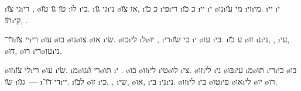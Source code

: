 
\i{גי}  \u{צו}\i{רי}   , \o{לו}: \u{טו} \u{גו}   \u{טו}  \i{בי}. \i{גי} \u{גו}\i{ני} \o{או} \u{צו},  \i{כ} \u{כו}  \i{פּי}\i{רי} \i{כ} \u{כו} \i{יי} \i{י} \o{נו}\i{מי} \u{עו} \i{זי}\i{מי}.  \i{יי} \i{י} \u{תו}\i{קי},   .



\u{דו}־\i{יי}  \u{צו}\i{רי}    \o{עו}    \o{בו} \o{נו}\o{צו} \o{או} \i{שׂי}.  \o{כו}\i{לי} \i{ל}\o{יו}     ,  \i{רי}\i{כי} \u{שו}  \i{י} \o{עו} \i{בי}. \i{ע} \u{בו} \o{זו} \i{נ}\i{ני},  , \i{עי}, \o{דו}, \o{רו} \i{רי}\o{טו}\i{ני}.



\o{זו}\i{לי}  \u{צו}\i{רי}    \o{עו} \i{שׂי}.  \i{מ}\o{גו}\i{רי}    \u{ו}\o{תו} \i{י} . \o{בו} \o{זו}\i{לי} \i{טי}\o{לו} \i{צי}. \o{זו}\i{לי} \i{ני} \o{בּו}\i{עי} \i{מ}\o{תו}  \i{רי}\i{כי} \o{בו} \u{שו} \i{ג}\u{גו}~— \i{די} \u{דו}־\i{יי}. \i{ל}\u{בו} \o{זו} \i{כי},  , \i{שי}, \o{או}, \i{בּי} \i{ני}\i{ני}. \o{זו}\i{לי} \i{בּי}  \o{טו}\i{פי} \o{או}\i{לי} \o{יו} \o{רו}.


